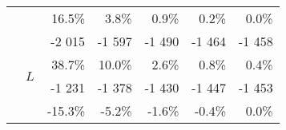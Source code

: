 {{{\begin{tabularx}{0.65\textwidth}{@{} XX rrrrr@{}}
					&&{\color{black}\scriptsize16.5\%}&{\color{black}\scriptsize3.8\%}&{\color{black}\scriptsize0.9\%}&{\color{black}\scriptsize0.2\%}&{\color{black}\scriptsize0.0\%}\\\cmidrule[0.5\cmidrulewidth]{2-7}
					&\multirow{4}{*}{$L$}&{\color{Tblue}\normalsize-2 015}&{\color{Tblue}\normalsize-1 597}&{\color{Tblue}\normalsize-1 490}&{\color{Tblue}\normalsize-1 464}&{\color{Tblue}\normalsize-1 458}\\
					&&{\color{Tblue}\scriptsize38.7\%}&{\color{Tblue}\scriptsize10.0\%}&{\color{Tblue}\scriptsize2.6\%}&{\color{Tblue}\scriptsize0.8\%}&{\color{Tblue}\scriptsize0.4\%}\\
					&&{\color{black}\normalsize-1 231}&{\color{black}\normalsize-1 378}&{\color{black}\normalsize-1 430}&{\color{black}\normalsize-1 447}&{\color{black}\normalsize-1 453}\\
					&&{\color{black}\scriptsize-15.3\%}&{\color{black}\scriptsize-5.2\%}&{\color{black}\scriptsize-1.6\%}&{\color{black}\scriptsize-0.4\%}&{\color{black}\scriptsize0.0\%}\\\bottomrule
				\end{tabularx}}
	}
}



